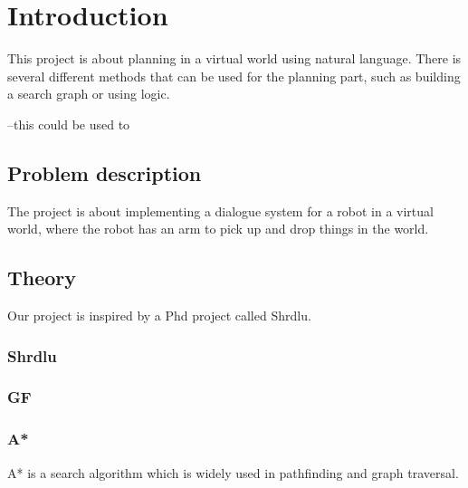 \chapter{Introduction}
This project is about planning in a virtual world using natural language. 
There is several different methods that can be used for the planning part, such as building a search graph or using logic. 

--this could be used to

\section{Problem description}
The project is about implementing a dialogue system for a robot in a virtual world, 
where the robot has an arm to pick up and drop things in the world.

\section{Theory}
Our project is inspired by a Phd project called Shrdlu.

\subsection{Shrdlu}


\subsection{GF}


\subsection{A*}
A* is a search algorithm which is widely used in pathfinding and graph traversal.


